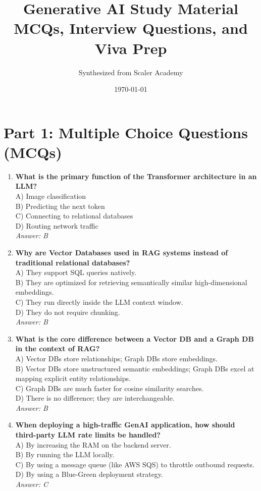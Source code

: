 \documentclass[12pt,a4paper]{article}
\title{\Huge \textbf{Generative AI Study Material} \\ \vspace{0.5cm} \Large MCQs, Interview Questions, and Viva Prep}
\author{Synthesized from Scaler Academy}
\date{\today}
\begin{document}
\maketitle
\tableofcontents
\newpage

\section{Part 1: Multiple Choice Questions (MCQs)}

\begin{enumerate}
    \item \textbf{What is the primary function of the Transformer architecture in an LLM?} \\
    A) Image classification \\
    B) Predicting the next token \\
    C) Connecting to relational databases \\
    D) Routing network traffic \\
    \textit{Answer: B}

    \item \textbf{Why are Vector Databases used in RAG systems instead of traditional relational databases?} \\
    A) They support SQL queries natively. \\
    B) They are optimized for retrieving semantically similar high-dimensional embeddings. \\
    C) They run directly inside the LLM context window. \\
    D) They do not require chunking. \\
    \textit{Answer: B}

    \item \textbf{What is the core difference between a Vector DB and a Graph DB in the context of RAG?} \\
    A) Vector DBs store relationships; Graph DBs store embeddings. \\
    B) Vector DBs store unstructured semantic embeddings; Graph DBs excel at mapping explicit entity relationships. \\
    C) Graph DBs are much faster for cosine similarity searches. \\
    D) There is no difference; they are interchangeable. \\
    \textit{Answer: B}

    \item \textbf{When deploying a high-traffic GenAI application, how should third-party LLM rate limits be handled?} \\
    A) By increasing the RAM on the backend server. \\
    B) By running the LLM locally. \\
    C) By using a message queue (like AWS SQS) to throttle outbound requests. \\
    D) By using a Blue-Green deployment strategy. \\
    \textit{Answer: C}


\end{enumerate}
\end{document}
